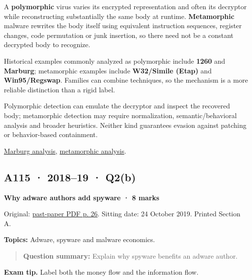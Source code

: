 \documentclass[11pt,a4paper]{article}
\begin{document}
A \textbf{polymorphic} virus varies its encrypted representation and often its decryptor while reconstructing substantially the same body at runtime. \textbf{Metamorphic} malware rewrites the body itself using equivalent instruction sequences,\allowbreak{} register changes,\allowbreak{} code permutation or junk insertion,\allowbreak{} so there need not be a constant decrypted body to recognize.


Historical examples commonly analyzed as polymorphic include \textbf{1260} and \textbf{Marburg}; metamorphic examples include \textbf{W32/\allowbreak{}Simile (Etap)} and \textbf{Win95/\allowbreak{}Regswap}. Families can combine techniques,\allowbreak{} so the mechanism is a more reliable distinction than a rigid label.


Polymorphic detection can emulate the decryptor and inspect the recovered body; metamorphic detection may require normalization,\allowbreak{} semantic/\allowbreak{}behavioral analysis and broader heuristics. Neither kind guarantees evasion against patching or behavior-based containment.


\href{https://www.f-secure.com/v-descs/marburg}{Marburg analysis},\allowbreak{} \href{https://www.virusbulletin.com/virusbulletin/2006/03/solving-metamorphic-puzzle}{metamorphic analysis}.




\clearpage
\subsection{A115 · 2018–19 · Q2(b)}\label{a115}

\textbf{Why adware authors add spyware · 8 marks}


Original: \href{../../CSE405-Security_Merged.pdf\#page=26}{past-paper PDF p. 26}. Sitting date: 24 October 2019. Printed Section A.


\textbf{Topics:} Adware,\allowbreak{} spyware and malware economics.



\begin{quote}\small

\textbf{Question summary:} Explain why spyware benefits an adware author.



\end{quote}


{\color{ForestGreen}\textbf{Exam tip.} Label both the money flow and the information flow.}
\end{document}
